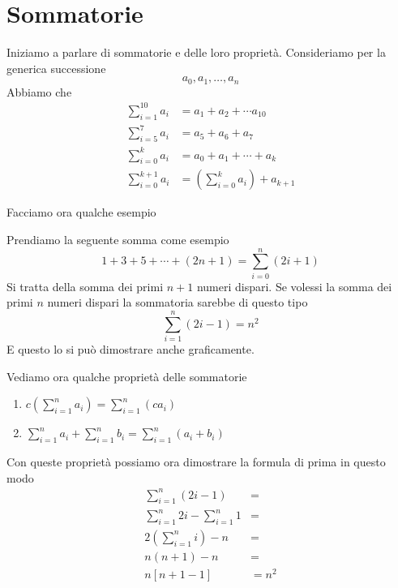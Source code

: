 \section{Sommatorie}
Iniziamo a parlare di sommatorie e delle loro propriet\`a. Consideriamo per la generica
successione
\begin{equation*}
	a_0, a_1, \dots, a_n
\end{equation*}
Abbiamo che
\begin{align*}
	\sum_{i = 1}^{10} a_i    & = a_1 + a_2 + \cdots a_{10}                     \\
	\sum_{i = 5}^7 a_i       & = a_5 + a_6 + a_7                               \\
	\sum_{i = 0}^k a_i       & = a_0 + a_1 + \cdots + a_k                      \\
	\sum_{i = 0}^{k + 1} a_i & = \left( \sum_{i = 0}^k a_i \right) + a_{k + 1}
\end{align*}

Facciamo ora qualche esempio
\begin{example}
	Prendiamo la seguente somma come esempio
	\begin{equation*}
		1 + 3 + 5 + \cdots + (2n + 1) = \sum_{i = 0}^n (2i + 1)
	\end{equation*}
	Si tratta della somma dei primi $n + 1$ numeri dispari.
	Se volessi la somma dei primi $n$ numeri dispari la sommatoria sarebbe di questo tipo
	\begin{equation*}
		\sum_{i = 1}^n (2i - 1) = n^2
	\end{equation*}
	E questo lo si pu\`o dimostrare anche graficamente.
\end{example}

Vediamo ora qualche propriet\`a delle sommatorie
\begin{enumerate}
	\item $c \left( \sum_{i = 1}^n a_i \right) = \sum_{i = 1}^n (c a_i)$
	\item $\sum_{i = 1}^n a_i + \sum_{i = 1}^n b_i = \sum_{i = 1}^n (a_i + b_i)$
\end{enumerate}

Con queste propriet\`a possiamo ora dimostrare la formula di prima in questo modo
\begin{align*}
	\sum_{i = 1}^n (2i - 1)               & =     \\
	\sum_{i = 1}^n 2i - \sum_{i = 1}^n 1  & =     \\
	2 \left( \sum_{i = 1}^n i \right) - n & =     \\
	n(n + 1) - n                          & =     \\
	n [n + 1 - 1]                         & = n^2
\end{align*}

